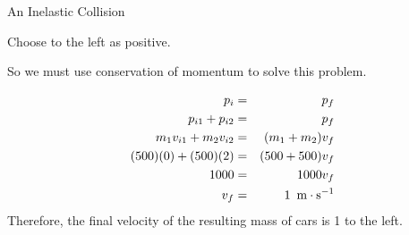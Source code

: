 \begin{wex}{An Inelastic Collision}
{
Choose to the left as positive.

So we must use conservation of momentum to solve this problem. 

\begin{eqnarray*}
p_{i} & = & p_{f} \\
p_{i1} + p_{i2} &=& p_{f} \\
m_{1}v_{i1} + m_{2}v_{i2} &=& (m_{1} +m_{2})v_f \\
(500)(0) + (500)(2) &=& (500+500)v_f \\
1 000 &=& 1000 v_f \\
v_f &=& 1\ \,\mathrm{m \cdot s^{-1}}
\end{eqnarray*}
Therefore, the final velocity of the resulting mass of cars is 1 \ms to the left.
}
\end{wex}
\clearpage
